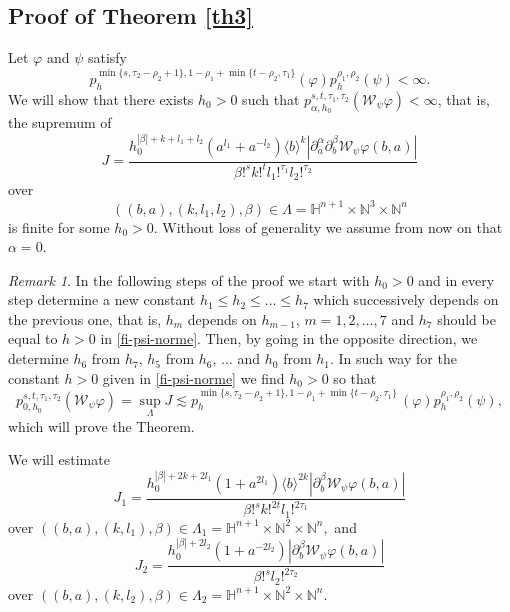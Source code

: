 \documentclass[reqno,12pt]{amsart}
\theoremstyle{plain}
\theoremstyle{definition}
\theoremstyle{remark}
\newtheorem{remark}{Remark}
\begin{document}
\subsection{Proof of Theorem \ref{th3}} Let
$ \varphi $ and $\psi $ satisfy
\begin{equation} \label{fi-psi-norme}
p^{\min\{s, \tau_2 - \rho_2+1 \}, 1 - \rho_1 + \min\{t  - \rho_2, \tau_1 \}} _{h } (\varphi)
p^{\rho_1, \rho_2}_{h} (\psi) < \infty.
\end{equation}
We will show that there exists $h_0>0$ such that $ p_{\alpha, h_0}^{s,
t, \tau_1, \tau_2} (\mathcal{W}_\psi \varphi) <\infty$, that is, the supremum
of
$$
J = \frac{h_0 ^{|\beta| +k+ l_1 + l_2} (a^{l_1} + a^{-l_2}) \langle
b \rangle^k |  \partial_a ^{\alpha} \partial_b ^{\beta} \mathcal{W}_\psi
\varphi (b,a) |}{ \beta!^s k!^{t} l_1 !^{\tau_1}  l_2 !^{\tau_2}}
$$
over
$$ ((b, a), (k, l_1, l_2), \beta) \in \Lambda = \mathbb{H}^{n+1} \times \mathbb{N}^3 \times
\mathbb{N}^n
$$
is finite for some $h_0>0$. Without loss of generality we assume from now on that $ \alpha = 0$.

\par

\begin{remark} \label{h constants}
In the following steps of the proof we start with $h_0>0$ and in
every step determine a new constant $h_1 \leq  h_2 \leq \dots \leq
h_7$ which successively depends on the previous one, that is, $ h_m $ depends on
$ h_{m-1}$, $ m = 1,2,\dots,7$ and $h_7$ should be equal to  $h>0$ in
\eqref{fi-psi-norme}.
Then, by going in the opposite direction, we determine   $h_6 $ from $h_7$,
$h_5 $ from $ h_6 $, $ \dots $ and $ h_0$ from $h_1$. In such way for the constant $h>0$ given in
\eqref{fi-psi-norme} we find $h_0 > 0 $ so that
$$
p^{s, t, \tau_1, \tau_2} _{0,h_0} (\mathcal{W}_\psi \varphi) = \sup_{\Lambda}
J \lesssim p_{h}^{\min\{s, \tau_2 - \rho_2+1\}, 1 - \rho_1 + \min\{t  -
\rho_2, \tau_1 \}} \, (\varphi) p^{\rho_1, \rho_2}
_{h} (\psi),
$$
which will prove the Theorem.
\end{remark}

\par

We will estimate
$$
J_1 = \frac{h_0 ^{|\beta| +2k+ 2l_1} (1 + a^{2l_1}) \langle b
\rangle^{2k} | \partial_b ^{\beta} \mathcal{W}_\psi \varphi (b,a) |}{ \beta!^s
k!^{2t} l_1 !^{2\tau_1}}
$$
over $ ((b, a), (k, l_1), \beta) \in \Lambda_1 = \mathbb{H}^{n+1}
\times \mathbb{N}^2 \times \mathbb{N}^n,$ and
$$
J_2 = \frac{h_0 ^{|\beta| + 2l_2}  (1 + a^{-2l_2}) | \partial_b
^{\beta} \mathcal{W}_\psi \varphi (b,a) |}{ \beta!^s  l_2 !^{2\tau_2}}
$$
over $ ((b, a), (k, l_2), \beta) \in \Lambda_2 = \mathbb{H}^{n+1}
\times \mathbb{N}^2 \times \mathbb{N}^n$.
\end{document}
